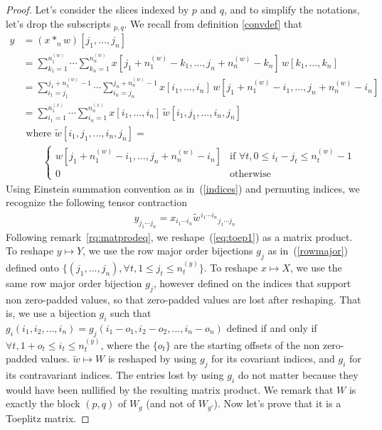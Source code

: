 \documentclass{article}
\theoremstyle{definition}
\theoremstyle{remark}
\theoremstyle{plain}
\begin{document}
\begin{proof}
Let's consider the slices indexed by $p$ and $q$, and to simplify the notations, let's drop the subscripts $\hspace{0pt}_{p,q}$. We recall from definition \ref{convdef} that
\begin{align*}
  y &= (x \ast_n w)[j_1, \ldots, j_n] \\
 &= \displaystyle \sum_{k_1=1}^{n_1^{(w)}} \cdots \sum_{k_n=1}^{n_n^{(w)}}
    x[j_1 + n_1^{(w)} - k_1, \ldots, j_n + n_n^{(w)} - k_n] \hspace{2pt} w[k_1, \ldots, k_n] \\
 &= \displaystyle \sum_{i_1=j_1}^{j_1 + n_1^{(w)} - 1} \cdots \sum_{i_n=j_n}^{j_n + n_n^{(w)} - 1}
    x[i_1, \ldots, i_n] \hspace{2pt} w[j_1 + n_1^{(w)} - i_1, \ldots, j_n + n_n^{(w)} - i_n] \\
 &= \displaystyle \sum_{i_1=1}^{n_1^{(x)}} \cdots \sum_{i_n=1}^{n_n^{(x)}}
    x[i_1, \ldots, i_n] \hspace{2pt} \widetilde{w}[i_1, j_1, \ldots, i_n, j_n] \\
 & \text{ where } \widetilde{w}[i_1, j_1, \ldots, i_n, j_n] = \\
 & \quad \quad
 \begin{cases}
   w[j_1 + n_1^{(w)} - i_1, \ldots, j_n + n_n^{(w)} - i_n] & \text{if } \forall t, 0 \le i_t - j_t \le n_t^{(w)} - 1 \\
   0 & \text{otherwise}
 \end{cases}
\end{align*}
Using Einstein summation convention as in~(\ref{indices}) and permuting indices, we recognize the following tensor contraction
\begin{align}
y_{j_1 \cdots j_n} = x_{i_1 \cdots i_n} \widetilde{w} \hspace{1pt}^{i_1 \cdots i_n} \hspace{0pt}_{j_1 \cdots j_n} \label{eq:toep1}
\end{align}
Following remark~\ref{rq:matprodeq}, we reshape~(\ref{eq:toep1}) as a matrix product. To reshape $y \mapsto Y$, we use the row major order bijections $g_j$ as in~(\ref{rowmajor}) defined onto $\{(j_1, \ldots, j_n), \forall t, 1 \le j_t \le n_t^{(y)}\}$. To reshape $x \mapsto X$, we use the same row major order bijection $g_j$, however defined on the indices that support non zero-padded values, so that zero-padded values are lost after reshaping. That is, we use a bijection $g_i$ such that $g_i(i_1, i_2, \ldots, i_n) = g_j(i_1 - o_1, i_2 - o_2, \ldots, i_n - o_n)$ defined if and only if $\forall t, 1 + o_t \le i_t \le n_t^{(y)}$, where the $\{o_t\}$ are the starting offsets of the non zero-padded values. $\widetilde{w} \mapsto W$ is reshaped by using $g_j$ for its covariant indices, and $g_i$ for its contravariant indices. The entries lost by using $g_i$ do not matter because they would have been nullified by the resulting matrix product. We remark that $W$ is exactly the block $(p,q)$ of $W_g$ (and not of $W_{g'}$). Now let's prove that it is a Toeplitz matrix.


\end{proof}
\end{document}
